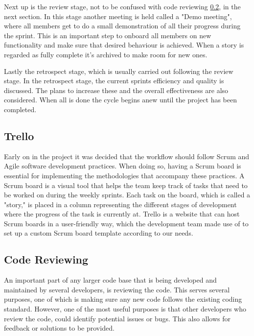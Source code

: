        Next up is the review stage, not to be confused with code reviewing \ref{sub:code-reviewing}, in the next section. In this stage another meeting is held called a "Demo meeting", where all members get to do a small demonstration of all their progress during the sprint. This is an important step to onboard all members on new functionality and make sure that desired behaviour is achieved. When a story is regarded as fully complete it's archived to make room for new ones.
    
        Lastly the retrospect stage, which is usually carried out following the review stage. In the retrospect stage, the current sprints efficiency and quality is discussed. The plans to increase these and the overall effectiveness are also considered. When all is done the cycle begins anew until the project has been completed.

    \subsection{Trello}
        Early on in the project it was decided that the workflow should follow Scrum and Agile software development practices. When doing so, having a Scrum board is essential for implementing the methodologies that accompany these practices. A Scrum board is a visual tool that helps the team keep track of tasks that need to be worked on during the weekly sprints. Each task on the board, which is called a "story," is placed in a column representing the different stages of development where the progress of the task is currently at. Trello\cite{trello} is a website that can host Scrum boards in a user-friendly way, which the development team made use of to set up a custom Scrum board template according to our needs. 


    \subsection{Code Reviewing} \label{sub:code-reviewing}
        An important part of any larger code base that is being developed and maintained by several developers, is reviewing the code. This serves several purposes, one of which is making sure any new code follows the existing coding standard. However, one of the most useful purposes is that other developers who review the code, could identify potential issues or bugs. This also allows for feedback or solutions to be provided.

